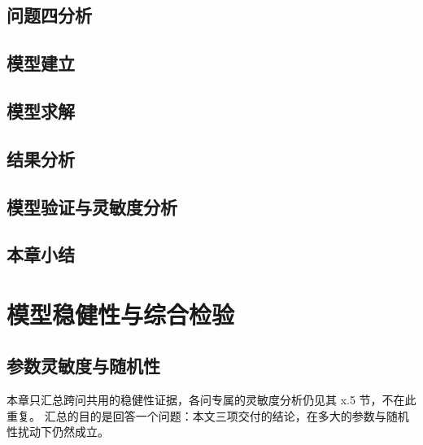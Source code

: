 \documentclass[bwprint]{gmcmthesis}
\numberwithin{equation}{section}
\numberwithin{figure}{section}
\numberwithin{table}{section}
\begin{document}

\subsection{问题四分析}

\subsection{模型建立}

\subsection{模型求解}

\subsection{结果分析}

\subsection{模型验证与灵敏度分析}

\subsection{本章小结}


\clearpage
\section{模型稳健性与综合检验}\label{sec:q3-sens}

%
%

\subsection{参数灵敏度与随机性}

本章只汇总跨问共用的稳健性证据，各问专属的灵敏度分析仍见其 x.5 节，不在此重复。
汇总的目的是回答一个问题：本文三项交付的结论，在多大的参数与随机性扰动下仍然成立。
\end{document}
